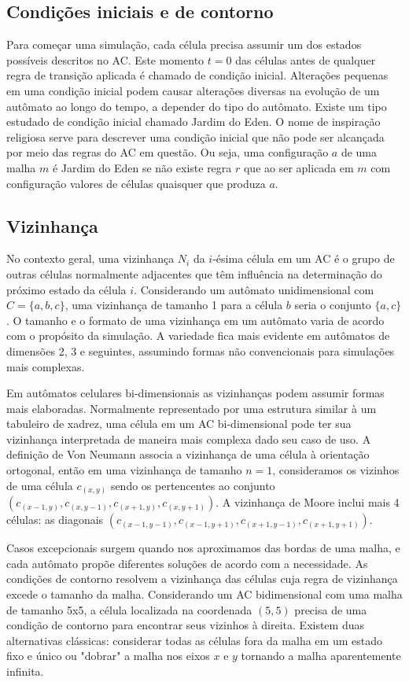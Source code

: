 \subsection{Condições iniciais e de contorno}
Para começar uma simulação, cada célula precisa assumir um dos estados possíveis descritos no AC. Este momento $t = 0$ das células antes de qualquer regra de transição aplicada é chamado de condição inicial. Alterações pequenas em uma condição inicial podem causar alterações diversas na evolução de um autômato ao longo do tempo, a depender do tipo do autômato. Existe um tipo estudado de condição inicial chamado Jardim do Eden. O nome de inspiração religiosa serve para descrever uma condição inicial que não pode ser alcançada por meio das regras do AC em questão. Ou seja, uma configuração $a$ de uma malha $m$ é Jardim do Eden se não existe regra $r$ que ao ser aplicada em $m$ com configuração valores de células quaisquer que produza $a$.

\subsection{Vizinhança}
No contexto geral, uma vizinhança $N_{i}$ da $i$-ésima célula em um AC é o grupo de outras células normalmente adjacentes que têm influência na determinação do próximo estado da célula $i$. Considerando um autômato unidimensional com $C = \{a, b, c\}$, uma vizinhança de tamanho 1 para a célula $b$ seria o conjunto $\{a, c\}$. O tamanho e o formato de uma vizinhança em um autômato varia de acordo com o propósito da simulação. A variedade fica mais evidente em autômatos de dimensões 2, 3 e seguintes, assumindo formas não convencionais para simulações mais complexas.

Em autômatos celulares bi-dimensionais as vizinhanças podem assumir formas mais elaboradas. Normalmente representado por uma estrutura similar à um tabuleiro de xadrez, uma célula em um AC bi-dimensional pode ter sua vizinhança interpretada de maneira mais complexa dado seu caso de uso. A definição de Von Neumann associa a vizinhança de uma célula à orientação ortogonal, então em uma vizinhança de tamanho $n = 1$, consideramos os vizinhos de uma célula $c_{(x,y)}$ sendo os pertencentes ao conjunto $(c_{(x-1,y)}, c_{(x,y-1)}, c_{(x+1,y)}, c_{(x,y+1)})$. A vizinhança de Moore inclui mais 4 células: as diagonais $(c_{(x-1,y-1)},c_{(x-1,y+1)}, c_{(x+1,y-1)}, c_{(x+1,y+1)})$.

Casos excepcionais surgem quando nos aproximamos das bordas de uma malha, e cada autômato propõe diferentes soluções de acordo com a necessidade. As condições de contorno resolvem a vizinhança das células cuja regra de vizinhança excede o tamanho da malha. Considerando um AC bidimensional com uma malha de tamanho 5x5, a célula localizada na coordenada $(5,5)$ precisa de uma condição de contorno para encontrar seus vizinhos à direita. Existem duas alternativas clássicas: considerar todas as células fora da malha em um estado fixo e único ou "dobrar" a malha nos eixos $x$ e $y$ tornando a malha aparentemente infinita.


